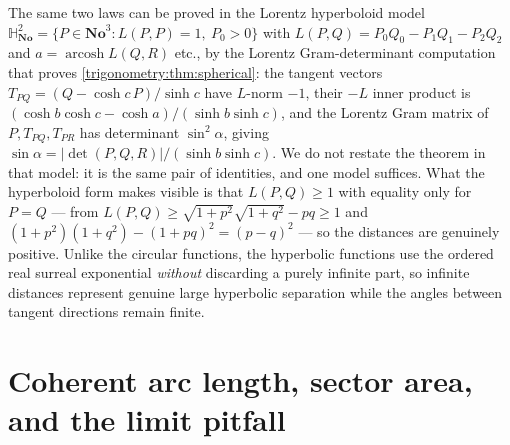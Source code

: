 \documentclass[11pt,letterpaper]{article}
\numberwithin{equation}{section}
\theoremstyle{definition}
\theoremstyle{remark}
\newcommand{\No}{\mathbf{No}}
\newcommand{\Hy}{\mathbb H}
\newcommand{\arcosh}{\operatorname{arcosh}}
\begin{document}
\begin{remark}\label{trigonometry:rem:hyperboloid}
The same two laws can be proved in the Lorentz hyperboloid model
$\Hy^2_{\No}=\{P\in\No^3:L(P,P)=1,\ P_0>0\}$ with $L(P,Q)=P_0Q_0-P_1Q_1-P_2Q_2$ and
$a=\arcosh L(Q,R)$ etc., by the Lorentz Gram-determinant computation that proves
\cref{trigonometry:thm:spherical}: the tangent vectors $T_{PQ}=(Q-\cosh c\,P)/\sinh c$ have
$L$-norm $-1$, their $-L$ inner product is
$(\cosh b\cosh c-\cosh a)/(\sinh b\sinh c)$, and the Lorentz Gram matrix of $P,T_{PQ},T_{PR}$ has
determinant $\sin^2\alpha$, giving
$\sin\alpha=|\det(P,Q,R)|/(\sinh b\sinh c)$. We do not restate the theorem in that model: it is the
same pair of identities, and one model suffices. What the hyperboloid form makes visible is that
$L(P,Q)\ge1$ with equality only for $P=Q$ --- from
$L(P,Q)\ge\sqrt{1+p^2}\sqrt{1+q^2}-pq\ge1$ and
$(1+p^2)(1+q^2)-(1+pq)^2=(p-q)^2$ --- so the distances are genuinely positive. Unlike the circular
functions, the hyperbolic functions use the ordered real surreal exponential \emph{without}
discarding a purely infinite part, so infinite distances represent genuine large hyperbolic
separation while the angles between tangent directions remain finite.
\end{remark}

\section{Coherent arc length, sector area, and the limit pitfall}
\label{trigonometry:sec:arcs}
\end{document}
